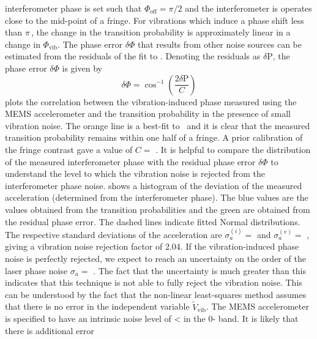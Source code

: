 interferometer phase is set such that $\Phi_\text{off} = \pi/2$ and
the interferometer is operates close to the
mid-point of a fringe. For vibrations which induce a phase shift less
than $\pi\,$\sivalue{}{\radian}, the change in the
transition probability is approximately linear in a change in
$\Phi_\text{vib}$. The
phase error $\delta \Phi$ that results from other noise sources can be estimated from the
residuals of the fit to .
Denoting the residuals as $\delta \text{P}$, the phase error $\delta
\Phi$ is given by 
\begin{equation}
\delta \Phi = \cos^{-1}\left(\frac{2 \delta \text{P}}{C}\right)
\end{equation}
 plots the correlation between the
vibration-induced phase measured using the MEMS accelerometer
and the transition probability in the presence of small vibration
noise. The orange line is a best-fit
to~ and it is clear that the
measured transition probability remains within one half of a fringe. A prior calibration of the
fringe contrast gave a value of $C = $ . It is helpful
to compare the distribution of the measured interferometer phase with
the residual phase error $\delta \Phi$ to understand the level to
which the vibration noise is rejected from the interferometer phase
noise.  shows a histogram of the
deviation of the measured acceleration (determined from the
interferometer phase). The blue values are the values obtained from
the transition probabilities and the green are obtained from the
residual phase error. The dashed lines indicate fitted Normal
distributions. The respective standard deviations of the acceleration
are $\sigma_a^{(i)} =$  and
$\sigma_a^{(v)} = $ , giving a vibration
noise rejection factor of 2.04. If the vibration-induced phase noise
is perfectly rejected, we expect to reach an uncertainty on the order
of the laser phase noise $\sigma_a =$ .
The fact that the uncertainty is much greater than this indicates that
this technique is not able to fully reject the vibration noise. This
can be understood by the fact that the non-linear least-squares method
assumes that there is no error in the independent variable
$\widetilde{V}_\text{vib}$. The MEMS accelerometer is specified to
have an intrinsic noise level of <  in the
0- band. It is likely that there is additional error
